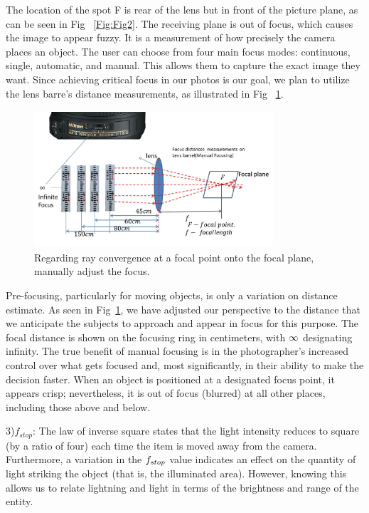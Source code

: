 \documentclass[sn-mathphys]{sn-jnl}%
\theoremstyle{thmstyleone}%
\theoremstyle{thmstyletwo}%
\theoremstyle{thmstylethree}%
\begin{document}
The location of the spot F is rear of the lens but in front of the picture plane, as can be seen in Fig ~\ref{Fig:Fig2}. The receiving plane is out of focus, which causes the image to appear fuzzy.
 It is a measurement of how precisely the camera places an object. The user can choose from four main focus modes: continuous, single, automatic, and manual. This allows them to capture the exact image they want. Since achieving critical focus in our photos is our goal, we plan to utilize the lens barre's distance measurements, as illustrated in Fig ~\ref{Fig:Fig3}.
\begin{figure}[!htbp]
\centerline{\includegraphics[height=2in,width=3.5in]{mfocusconv.jpg}}
\caption{Regarding ray convergence at a focal point onto the focal plane, manually adjust the focus.}
\label{Fig:Fig3}
\end{figure}\par
Pre-focusing, particularly for moving objects, is only a variation on distance estimate. As seen in Fig~\ref{Fig:Fig3}, we have adjusted our perspective to the distance that we anticipate the subjects to approach and appear in focus for this purpose. The focal distance is shown on the focusing ring in centimeters, with  $\mathnormal{\infty}$ designating infinity. The true benefit of manual focusing is in the photographer's increased control over what gets focused and, most significantly, in their ability to make the decision faster. When an object is positioned at a designated focus point, it appears crisp; nevertheless, it is out of focus (blurred) at all other places, including those above and below.

3){$f_{stop}$}: The law of inverse square states that the light intensity reduces to square (by a ratio of four) each time the item is moved away from the camera. \cite{bib12} Furthermore, a variation in the $\mathnormal{f_{stop}}$ value indicates an effect on the quantity of light striking the object (that is, the illuminated area). However, knowing this allows us to relate lightning and light in terms of the brightness and range of the entity. 
\end{document}
